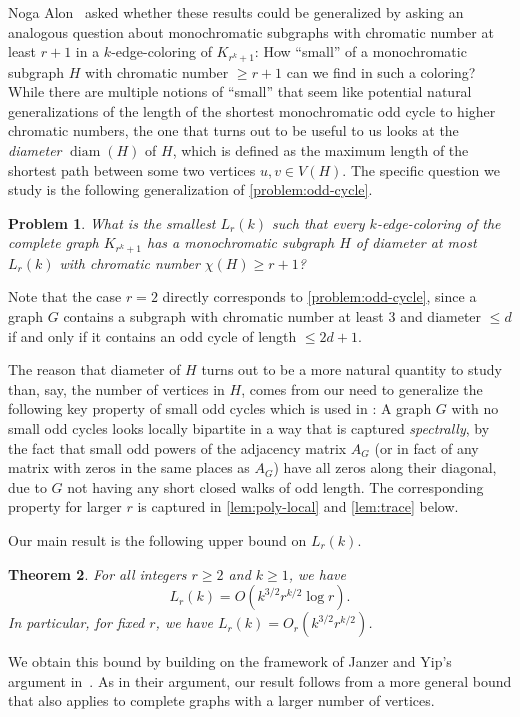 \documentclass[reqno]{amsart}
\newtheorem{theorem}{Theorem}
\newtheorem{problem}[theorem]{Problem}
\theoremstyle{remark}
\theoremstyle{definition}
\numberwithin{theorem}{section}
\renewcommand{\le}{\leqslant}
\renewcommand{\ge}{\geqslant}
\newcommand{\lpr}[1]{\left(#1\right)}
\newcommand{\diam}{\operatorname{diam}}
\begin{document}
Noga Alon~\cite{Noga1} asked whether these results could be generalized by asking an analogous question about monochromatic subgraphs with chromatic number at least $r+1$ in a $k$-edge-coloring of $K_{r^k+1}$: How ``small'' of a monochromatic subgraph $H$ with chromatic number $\ge r+1$ can we find in such a coloring? While there are multiple notions of ``small'' that seem like potential natural generalizations of the length of the shortest monochromatic odd cycle to higher chromatic numbers, the one that turns out to be useful to us looks at the \emph{diameter} $\diam(H)$ of $H$, which is defined as the maximum length of the shortest path between some two vertices $u,v\in V(H)$. The specific question we study is the following generalization of \cref{problem:odd-cycle}.

\begin{problem}
    What is the smallest $L_r(k)$ such that every $k$-edge-coloring of the complete graph $K_{r^k+1}$ has a monochromatic subgraph $H$ of diameter at most $L_r(k)$ with chromatic number $\chi(H) \ge r+1$?
\end{problem}
Note that the case $r = 2$ directly corresponds to \cref{problem:odd-cycle}, since a graph $G$ contains a subgraph with chromatic number at least $3$ and diameter $\le d$ if and only if it contains an odd cycle of length $\le 2d+1$. 

The reason that diameter of $H$ turns out to be a more natural quantity to study than, say, the number of vertices in $H$, comes from our need to generalize the following key property of small odd cycles which is used in \cite{JanzerYip2026ShortMonochromaticOddCycles}: A graph $G$ with no small odd cycles looks locally bipartite in a way that is captured \emph{spectrally}, by the fact that small odd powers of the adjacency matrix $A_G$ (or in fact of any matrix with zeros in the same places as $A_G$) have all zeros along their diagonal, due to $G$ not having any short closed walks of odd length. The corresponding property for larger $r$ is captured in \cref{lem:poly-local} and \cref{lem:trace} below.

Our main result is the following upper bound on $L_r(k)$.

\begin{theorem}\label{thm:ub}
 For all integers $r\ge 2$ and $k\ge 1$, we have
 \[L_r(k)= O\lpr{k^{3/2}r^{k/2}\log r}.\]
 In particular, for fixed $r$, we have $L_r(k)= O_r\lpr{k^{3/2}r^{k/2}}$.
\end{theorem}

We obtain this bound by building on the framework of Janzer and Yip's argument in~\cite{JanzerYip2026ShortMonochromaticOddCycles}. As in their argument, our result follows from a more general bound that also applies to complete graphs with a larger number of vertices.
\end{document}
